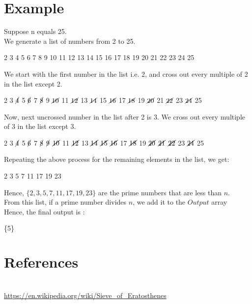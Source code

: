 \documentclass[11pt]{article}
\begin{document}
\section{Example}
Suppose n equals 25.\\
We generate a list of numbers from 2 to 25.
\begin{center}
 2  3  4  5  6  7  8  9  10 11 12 13 14 15 16 17 18 19 20 21 22 23 24 25
\end{center}
We start with the first number in the list i.e. 2, and cross out every multiple of 2 in the list except 2.
\begin{center}
 2  3  $\cancel{4}$  5  $\cancel{6}$  7  $\cancel{8}$  9  $\cancel{10}$ 11 $\cancel{12}$ 13 $\cancel{14}$ 15 $\cancel{16}$ 17 $\cancel{18}$ 19 $\cancel{20}$ 21 $\cancel{22}$ 23 $\cancel{24}$ 25
\end{center}
Now, next uncrossed number in the list after 2 is 3. We cross out every multiple of 3 in the list except 3.
\begin{center}
 2  3  $\cancel{4}$  5  $\cancel{6}$  7  $\cancel{8}$  $\cancel{9}$  $\cancel{10}$ 11 $\cancel{12}$ 13 $\cancel{14}$ $\cancel{15}$ $\cancel{16}$ 17 $\cancel{18}$ 19 $\cancel{20}$ $\cancel{21}$ $\cancel{22}$ 23 $\cancel{24}$ 25
\end{center}
Repeating the above process for the remaining elements in the list, we get:
\begin{center}
 2  3   5  7  11  17  19  23 
\end{center}
Hence, $\{2, 3, 5, 7, 11, 17, 19, 23\}$ are the prime numbers that are less than $n$.\\
From this list, if a prime number divides $n$, we add it to the $Output$ array\\
Hence, the final output is :
\begin{center}
   \{5\}  
\end{center}
\section{References}\\

\url{https://en.wikipedia.org/wiki/Sieve_of_Eratosthenes}
\end{document}
